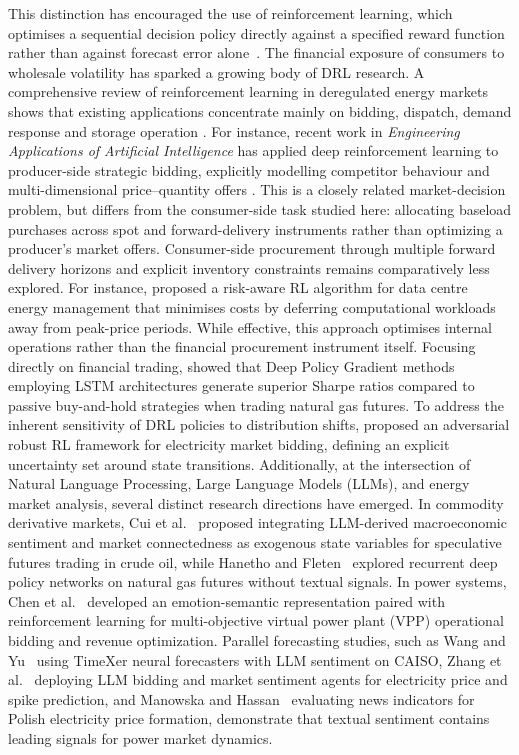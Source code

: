 This distinction has encouraged the use of reinforcement learning, which optimises a sequential decision policy directly against a specified reward function rather than against forecast error alone~\cite{sutton2018reinforcement}.
The financial exposure of consumers to wholesale volatility has sparked a growing 
body of DRL research. A comprehensive review of reinforcement learning in deregulated energy markets shows that existing applications concentrate mainly on bidding, dispatch, demand response and storage operation \cite{zhu2023reinforcement, ochoa2022multiagent}. For instance, recent work in \textit{Engineering Applications of Artificial Intelligence} has applied deep reinforcement learning to producer-side strategic bidding, explicitly modelling competitor behaviour and multi-dimensional price--quantity offers \cite{hu2025strategicbidding}. This is a closely related market-decision problem, but differs from the consumer-side task studied here: allocating baseload purchases across spot and forward-delivery instruments rather than optimizing a producer's market offers. Consumer-side procurement through multiple forward delivery horizons and explicit inventory constraints remains comparatively less explored. For instance, \cite{ding2025risk} proposed a risk-aware RL 
algorithm for data centre energy management that minimises costs by deferring 
computational workloads away from peak-price periods. While effective, this approach 
optimises internal operations rather than the financial procurement instrument itself.
Focusing directly on financial trading, \cite{hanetho2023commodities} showed that 
Deep Policy Gradient methods employing LSTM architectures generate superior Sharpe 
ratios compared to passive buy-and-hold strategies when trading natural gas futures.
To address the inherent sensitivity of DRL policies to distribution shifts, 
\cite{qiu2025robust} proposed an adversarial robust RL framework for electricity 
market bidding, defining an explicit uncertainty set around state transitions.
Additionally, at the intersection of Natural Language Processing, Large Language Models (LLMs), and energy market analysis, several distinct research directions have emerged. In commodity derivative markets, Cui et al.~\cite{cui2025toward} proposed integrating LLM-derived macroeconomic sentiment and market connectedness as exogenous state variables for speculative futures trading in crude oil, while Hanetho and Fleten~\cite{hanetho2023commodities} explored recurrent deep policy networks on natural gas futures without textual signals. In power systems, Chen et al.~\cite{chen2025modeling} developed an emotion-semantic representation paired with reinforcement learning for multi-objective virtual power plant (VPP) operational bidding and revenue optimization. Parallel forecasting studies, such as Wang and Yu~\cite{wang2025electricity} using TimeXer neural forecasters with LLM sentiment on CAISO, Zhang et al.~\cite{tempr2025llm} deploying LLM bidding and market sentiment agents for electricity price and spike prediction, and Manowska and Hassan~\cite{manowska2026modeling} evaluating news indicators for Polish electricity price formation, demonstrate that textual sentiment contains leading signals for power market dynamics.

